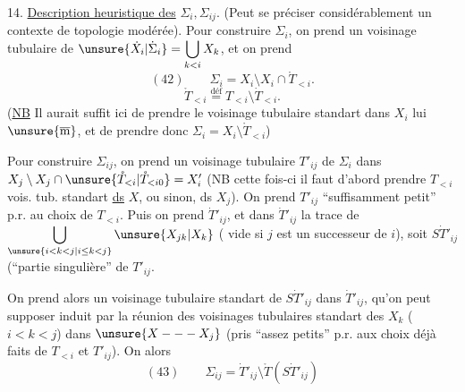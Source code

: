 14. \uline{Description heuristique des} $\Sigma_i,\Sigma_{ij}$.
(Peut se préciser considérablement  un contexte de topologie modérée).
Pour construire $\Sigma_i$, on prend un voisinage tubulaire
  de
$\unsure{\dot X_i|\dot\Sigma_i}=\displaystyle\bigcup_{k<i}X_k$, et on prend
\[
(42)\qquad\Sigma_i=X_i\setminus X_i\cap\mathring T_{<i}.
\]
\[
\mathring T_{<i}\overset{\mathrm{déf}}{=}T_{<i}\setminus\dot T_{<i}.
\]
(\uline{NB} Il aurait suffit ici de prendre le voisinage tubulaire
standart dans $X_i$ lui $\unsure{\overline{\mathrm m}}$, et de prendre donc
$\Sigma_i=X_i\setminus\mathring T_{<i}$)

Pour construire $\Sigma_{ij}$, on prend un voisinage tubulaire
$T'_{ij}$ de $\Sigma_i$ dans
$X_j\setminus X_j\cap\unsure{\mathring T_{<i}|\mathring T_{<i0}}=X'_i$
(NB cette fois-ci il faut  d'abord prendre
$T_{<i}$ vois. tub. standart \uline{ds} $X$, ou sinon, ds $X_j$).
On prend $T'_{ij}$ ``suffisamment petit'' p.r. au choix de $T_{<i}$.
Puis on prend $\dot T'_{ij}$, et dans $\dot T'_{ij}$
la trace de $\displaystyle\bigcup_{\unsure{i<k<j|i\leq k<j}}\unsure{X_{jk}|X_k}$
( vide si $j$ est un successeur de $i$), soit $S\dot T'_{ij}$
(``partie singulière'' de $T'_{ij}$.


On prend alors un voisinage tubulaire standart
 de $S\dot T'_{ij}$ dans $\dot T'_{ij}$,
qu'on peut supposer induit par la réunion 
des voisinages tubulaires standart des $X_k$ ($i<k<j$)
dans $\unsure{X---X_j}$
(pris ``assez petits'' p.r. aux choix déjà faits de $T_{<i}$
et  $T'_{ij}$).
On  alors
\[
(43)\qquad\Sigma_{ij}=\dot T'_{ij}\setminus\mathring T(S\dot T'_{ij})
\]
